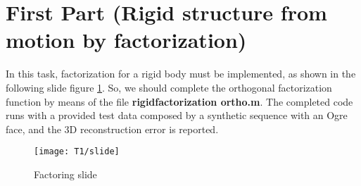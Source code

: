 \section{First Part (Rigid structure from motion by factorization)}
\noindent In this task, factorization for a rigid body must be implemented, as shown in the following slide figure \ref{fig:slideT1}.
\noindent So, we should complete the orthogonal factorization function by means of the file \textbf{rigidfactorization ortho.m}. The completed code runs with a provided test data composed by a synthetic sequence with an Ogre face, and the 3D reconstruction error is reported.\\

\begin{figure}[h]
    \centering
    \texttt{[image: T1/slide]}
    \caption{Factoring slide}
    \label{fig:slideT1}
\end{figure}

